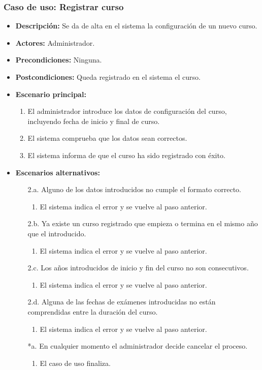 \subsubsection*{Caso de uso: Registrar curso}
\begin{itemize}
\item{\bf Descripción:} Se da de alta en el sistema la configuración de un nuevo curso.
\item{\bf Actores:} Administrador.
\item{\bf Precondiciones:} Ninguna.
\item{\bf Postcondiciones:} Queda registrado en el sistema el curso.
\item{\bf Escenario principal:}
  \begin{enumerate}
  \item El administrador introduce los datos de configuración del curso, incluyendo fecha de inicio y final de curso.
  \item El sistema comprueba que los datos sean correctos.
  \item El sistema informa de que el curso ha sido registrado con éxito.
  \end{enumerate}
\item{\bf Escenarios alternativos:}
  \begin{itemize}
  \item[2.a.] Alguno de los datos introducidos no cumple el formato correcto.
    \begin{enumerate}
    \item El sistema indica el error y se vuelve al paso anterior.
    \end{enumerate}
  \item[2.b.] Ya existe un curso registrado que empieza o termina en el mismo año que el introducido.
    \begin{enumerate}
    \item El sistema indica el error y se vuelve al paso anterior.
    \end{enumerate}
  \item[2.c.] Los años introducidos de inicio y fin del curso no son consecutivos.
    \begin{enumerate}
    \item El sistema indica el error y se vuelve al paso anterior.
    \end{enumerate}
  \item[2.d.] Alguna de las fechas de exámenes introducidas no están comprendidas entre la duración del curso.
    \begin{enumerate}
    \item El sistema indica el error y se vuelve al paso anterior.
    \end{enumerate}
  \item[*a.] En cualquier momento el administrador decide cancelar el proceso.
    \begin{enumerate}
    \item El caso de uso finaliza.
    \end{enumerate}
  \end{itemize}
\end{itemize}



